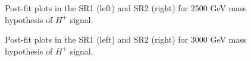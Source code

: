 \begin{figure}[H]
  \centering
  \caption{Post-fit plots in the SR1 (left) and SR2 (right) for 2500 GeV mass hypothesis of $H^{+}$ signal.}
  \label{fig:Postfit_Hp1000_Asimov}
\end{figure}
\begin{figure}[H]
  \centering
  \caption{Post-fit plots in the SR1 (left) and SR2 (right) for 3000 GeV mass hypothesis of $H^{+}$ signal.}
  \label{fig:Postfit_Hp1000_Asimov}
\end{figure}
